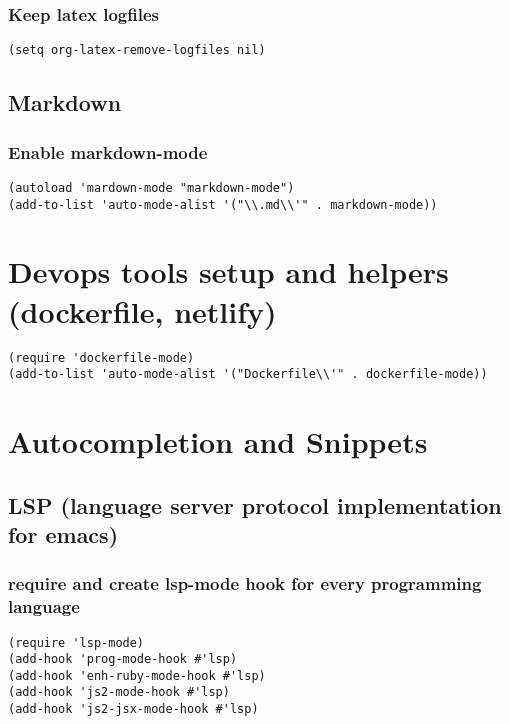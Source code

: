 \documentclass[11pt]{article}
\begin{document}
\subsubsection*{Keep latex logfiles}
\label{sec:org63fad50}
\begin{verbatim}
(setq org-latex-remove-logfiles nil)
\end{verbatim}


\subsection*{Markdown}
\label{sec:orgdd06628}

\subsubsection*{Enable markdown-mode}
\label{sec:org8124812}
\begin{verbatim}
(autoload 'mardown-mode "markdown-mode")
(add-to-list 'auto-mode-alist '("\\.md\\'" . markdown-mode))
\end{verbatim}


\section*{Devops tools setup and helpers (dockerfile, netlify)}
\label{sec:orgbf48e26}

\begin{verbatim}
(require 'dockerfile-mode)
(add-to-list 'auto-mode-alist '("Dockerfile\\'" . dockerfile-mode)) 
\end{verbatim}


\section*{Autocompletion and Snippets}
\label{sec:org334d1f8}

\subsection*{LSP (language server protocol implementation for emacs)}
\label{sec:org0f6958f}

\subsubsection*{require and create lsp-mode hook for every programming language}
\label{sec:orgdcfafd0}
\begin{verbatim}
(require 'lsp-mode)
(add-hook 'prog-mode-hook #'lsp) 
(add-hook 'enh-ruby-mode-hook #'lsp) 
(add-hook 'js2-mode-hook #'lsp) 
(add-hook 'js2-jsx-mode-hook #'lsp) 
\end{verbatim}
\end{document}
